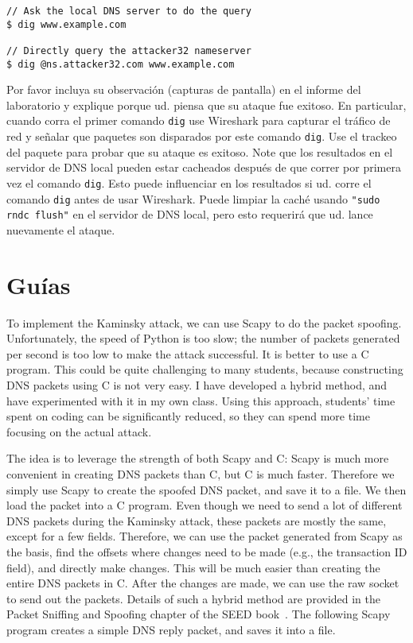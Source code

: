 \begin{lstlisting}
// Ask the local DNS server to do the query
$ dig www.example.com

// Directly query the attacker32 nameserver
$ dig @ns.attacker32.com www.example.com
\end{lstlisting}
 
Por favor incluya su observación (capturas de pantalla) en el informe del laboratorio y explique porque ud. piensa que su ataque fue exitoso.
En particular, cuando corra el primer comando \texttt{dig} use Wireshark para capturar el tráfico de red y señalar que paquetes son disparados por este comando  \texttt{dig}. Use el trackeo del paquete para probar que su ataque es exitoso. Note que los resultados en el servidor de DNS local pueden estar cacheados después de que correr por primera vez el comando \texttt{dig}. Esto puede influenciar en los resultados si ud. corre el comando \texttt{dig} antes de usar Wireshark. Puede limpiar la caché usando  \texttt{"sudo rndc flush"}  en el servidor de DNS local, pero esto requerirá que ud. lance nuevamente el ataque.


\section{Guías} 

To implement the Kaminsky attack, we can use Scapy to do the packet spoofing. Unfortunately,
the speed of Python is too slow; the number of packets generated per second is too low to
make the attack successful. It is better to use a C program. This could
be quite challenging to many students, because constructing DNS packets using C is not very
easy. I have developed a hybrid method, and have experimented with it in my own class. Using
this approach, students' time spent on coding can be significantly reduced, so they can spend
more time focusing on the actual attack.


The idea is to leverage the strength of both Scapy and C: Scapy is much more convenient in
creating DNS packets than C, but C is much faster. Therefore we simply
use Scapy to create the spoofed DNS packet, and save it to a file.
We then load the packet into a C program. Even though we need to send a 
lot of different DNS packets
during the Kaminsky attack, these packets are mostly the same, except for a few fields. 
Therefore, we can
use the packet generated from Scapy as the basis, find the offsets where
changes need to be made (e.g., the transaction ID field),
and directly make changes. This will be much easier than
creating the entire DNS packets in C.
After the changes are made, we can use the raw socket to send out the packets.
Details of such a hybrid method are provided in
the Packet Sniffing and Spoofing chapter 
of the SEED book~\cite{seedbook}.
The following Scapy program creates a simple DNS reply packet, 
and saves it into a file.


